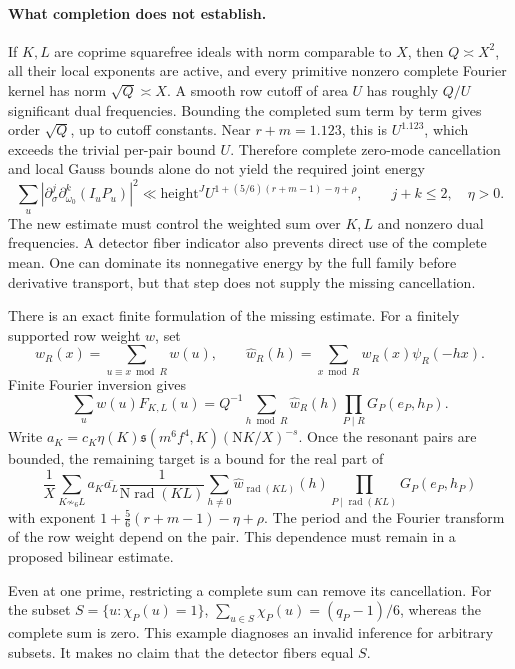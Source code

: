\documentclass[11pt]{article}
\newcommand{\Nm}{\mathrm N}
\newcommand{\rad}{\operatorname{rad}}
\begin{document}
\paragraph{What completion does not establish.}
If \(K,L\) are coprime squarefree ideals with norm comparable to
\(X\), then \(Q\asymp X^2\), all their local exponents are active,
and every primitive nonzero complete Fourier kernel has norm
\(\sqrt Q\asymp X\). A smooth row cutoff of area \(U\) has roughly
\(Q/U\) significant dual frequencies. Bounding the completed sum
term by term gives order \(\sqrt Q\), up to cutoff constants.
Near \(r+m=1.123\), this is \(U^{1.123}\), which exceeds the
trivial per-pair bound \(U\).
Therefore complete zero-mode cancellation and local Gauss bounds alone
do not yield the required joint energy
\[
 \sum_u |\partial_\sigma^j\partial_{\omega_0}^k(I_uP_u)|^2
 \ll \mathrm{height}^J U^{1+(5/6)(r+m-1)-\eta+\rho},
 \qquad j+k\le2,\quad\eta>0.
\]
The new estimate must control the weighted sum over \(K,L\) and
nonzero dual frequencies. A detector fiber indicator also prevents
direct use of the complete mean. One can dominate its nonnegative
energy by the full family before derivative transport, but that step
does not supply the missing cancellation.

There is an exact finite formulation of the missing estimate.
For a finitely supported row weight \(w\), set
\[
 w_R(x)=\sum_{u\equiv x\bmod R}w(u),\qquad
 \widehat w_R(h)=\sum_{x\bmod R}w_R(x)\psi_R(-hx).
\]
Finite Fourier inversion gives
\[
 \sum_u w(u)F_{K,L}(u)
   =Q^{-1}\sum_{h\bmod R}\widehat w_R(h)
                    \prod_{P\mid R}G_P(e_P,h_P).
\]
Write
\(a_K=c_K\eta(K)\mathfrak s(m^6f^4,K)(\Nm K/X)^{-s}\).
Once the resonant pairs are bounded, the remaining target is a bound
for the real part of
\[
 \frac1X\sum_{K\not\sim_6 L}a_K\overline{a_L}
 \frac1{\Nm\rad(KL)}
 \sum_{h\ne0}\widehat w_{\rad(KL)}(h)
                \prod_{P\mid\rad(KL)}G_P(e_P,h_P)
\]
with exponent \(1+\frac56(r+m-1)-\eta+\rho\).
The period and the Fourier transform of the row weight depend on the
pair. This dependence must remain in a proposed bilinear estimate.

Even at one prime, restricting a complete sum can remove its
cancellation. For the subset \(S=\{u:\chi_P(u)=1\}\),
\(\sum_{u\in S}\chi_P(u)=(q_P-1)/6\), whereas the complete sum is
zero. This example diagnoses an invalid inference for arbitrary
subsets. It makes no claim that the detector fibers equal \(S\).
\end{document}
